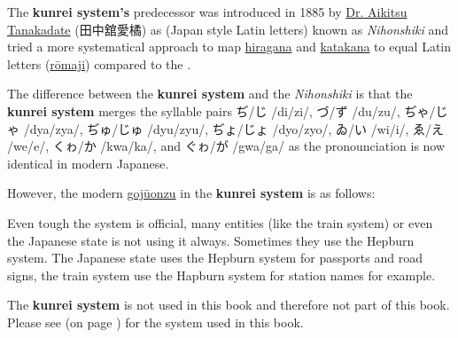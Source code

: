 The \textbf{kunrei system's} predecessor was introduced in 1885 by \Link
\href{https://en.wikipedia.org/wiki/Tanakadate_Aikitsu}{Dr. Aikitsu Tanakadate}
({田中舘愛橘}) as
(Japan style Latin letters) known as \textit{Nihonshiki} and tried a more
systematical approach to map \hyperref[sec:Hiragana]{hiragana} and
\hyperref[sec:Katakana]{katakana} to equal Latin letters
(\hyperref[sec:Romaji]{rōmaji}) compared to the .

The difference between the \textbf{kunrei system} and the \textit{Nihonshiki}
is that the \textbf{kunrei system} merges the syllable pairs ぢ/じ /di/zi/,
づ/ず /du/zu/, ぢゃ/じゃ /dya/zya/, ぢゅ/じゅ /dyu/zyu/, ぢょ/じょ /dyo/zyo/,
ゐ/い /wi/i/, ゑ/え /we/e/, くゎ/か /kwa/ka/, and ぐゎ/が /gwa/ga/ as the
pronounciation is now identical in modern Japanese.

However, the modern \hyperref[sec:Gojuonzu]{gojūonzu} in the \textbf{kunrei
system} is as follows:


Even tough the system is official, many entities (like the train system) or
even the Japanese state is not using it always. Sometimes they use the Hepburn
system. The Japanese state uses the Hepburn system for passports and road
signs, the train system use the Hapburn system for station names for example.

The \textbf{kunrei system} is not used in this book and therefore not part of
this book. Please see  (on page \pageref{sec:Hepburn}) for
the system used in this book.
